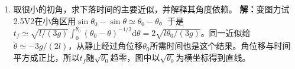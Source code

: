 \documentclass[UTF8,fontset=fandol,a4paper,11pt]{ctexart}
\begin{document}
\begin{enumerate}
\item 取很小的初角，求下落时间的主要近似，并解释其角度依赖。
\textbf{解：}变图力试2.5V2在小角区用$\sin\theta_0-\sin\theta\simeq\theta_0-\theta$。于是$t_f\simeq\sqrt{l/(3g)}\int_0^{\theta_0}(\theta_0-\theta)^{-1/2}\mathrm d\theta=2\sqrt{l\theta_0/(3g)}$。同一近似给$\ddot\theta\simeq-3g/(2l)$，从静止经过角位移$\theta_0$所需时间也是这个结果。角位移与时间平方成正比，所以$t_f$随$\sqrt{\theta_0}$趋零，图中以$\sqrt{\theta_0}$为横坐标得到直线。
\begin{center}\begin{minipage}{.98\linewidth}\centering
{}
\end{minipage}
\end{center}
\end{enumerate}
\end{document}
